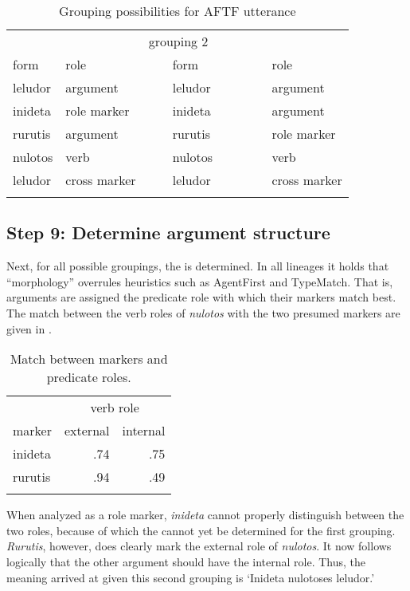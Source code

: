 \documentclass[output=paper]{LSP/langsci}
\begin{document}
\begin{table}
\begin{tabularx}{.75\textwidth}{p{1cm}p{2cm}Xp{1cm}p{2cm}}
\lsptoprule
\multicolumn{2}{c}{grouping 1~~~~~~~~}&&\multicolumn{2}{c}{grouping 2~~~~~~~~}\\
form & role &&form & role\\
\midrule
leludor & argument 	&& leludor & argument 	\\
inideta & role marker 	&& inideta & argument\\
rurutis & argument	&& rurutis & role marker 	\\
nulotos & verb 		&& nulotos & verb 	\\
leludor & cross marker	&& leludor & cross marker 	\\
\lspbottomrule
\end{tabularx}
\caption{Grouping possibilities for AFTF utterance\label{17-le-tab:5}}
\end{table}

\subsection{Step 9: Determine argument structure}\label{17-le-sec:Determine-Structure}
Next, for all possible groupings, the  is determined. In all lineages it holds that ``morphology'' overrules heuristics such as AgentFirst and TypeMatch. That is, arguments are assigned the predicate role with which their markers match best. The match between the verb roles of \textit{nulotos} with the two presumed markers are given in .

\begin{table}
\begin{tabular}{lrr}
\lsptoprule
			&\multicolumn{2}{c}{verb role}\\
marker	&external	&internal\\
			\midrule
inideta	&.74	&.75	\\
rurutis &.94	&.49	\\
\lspbottomrule
\end{tabular}
\caption{Match between markers and predicate roles.}\label{17-le-tab:6}
\end{table}

When analyzed as a role marker, \textit{inideta} cannot properly distinguish between the two roles, because of which the  cannot yet be determined for the first grouping. \textit{Rurutis}, however, does clearly mark the external role of \textit{nulotos}. It now follows logically that the other argument should have the internal role. Thus, the meaning arrived at given this second grouping is `Inideta nulotoses leludor.' 
\end{document}
